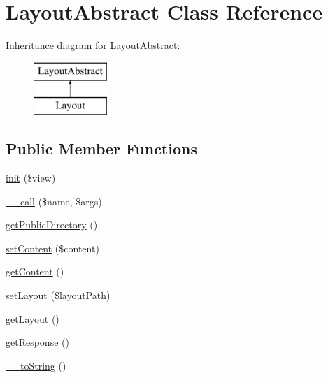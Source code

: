 \hypertarget{class_anemo_1_1_layout_1_1_layout_abstract}{
\section{LayoutAbstract Class Reference}
\label{class_anemo_1_1_layout_1_1_layout_abstract}
}
Inheritance diagram for LayoutAbstract:\begin{figure}[H]
\begin{center}
\leavevmode
\includegraphics[height=2.000000cm]{class_anemo_1_1_layout_1_1_layout_abstract}
\end{center}
\end{figure}
\subsection*{Public Member Functions}
\begin{DoxyCompactItemize}
\item 
\hyperlink{class_anemo_1_1_layout_1_1_layout_abstract_ae1df4c5075648a2e07aed057d8787f92}{init} (\$view)
\item 
\hyperlink{class_anemo_1_1_layout_1_1_layout_abstract_af231e86ad32039b9573ae228db5a29fa}{\_\-\_\-call} (\$name, \$args)
\item 
\hyperlink{class_anemo_1_1_layout_1_1_layout_abstract_a2b499b838eaae57e7d79a0619336d93f}{getPublicDirectory} ()
\item 
\hyperlink{class_anemo_1_1_layout_1_1_layout_abstract_a04a5eddb7c3abc7bf31fa25b58f046bf}{setContent} (\$content)
\item 
\hyperlink{class_anemo_1_1_layout_1_1_layout_abstract_a58e43f09a06ce4e29b192c4e17ce7915}{getContent} ()
\item 
\hyperlink{class_anemo_1_1_layout_1_1_layout_abstract_a924a0224f8b36a2eae556458facc3b3f}{setLayout} (\$layoutPath)
\item 
\hyperlink{class_anemo_1_1_layout_1_1_layout_abstract_a5c316721766e9cd8ad5d0085e64048ed}{getLayout} ()
\item 
\hyperlink{class_anemo_1_1_layout_1_1_layout_abstract_a6c907e8af775e517a77037dd0164222f}{getResponse} ()
\item 
\hyperlink{class_anemo_1_1_layout_1_1_layout_abstract_a7516ca30af0db3cdbf9a7739b48ce91d}{\_\-\_\-toString} ()
\end{DoxyCompactItemize}
